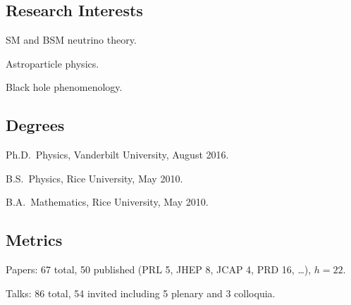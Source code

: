 \documentclass{article}
\renewenvironment{itemize}{
\begin{list}{}{
\setlength{\leftmargin}{.5em}}}{
\end{list}}
\begin{document}
\subsection*{Research Interests}
\begin{itemize}
\item SM and BSM neutrino theory.
\item Astroparticle physics.
\item Black hole phenomenology.
\end{itemize}

\subsection*{Degrees}
\begin{itemize}
\item Ph.D.~Physics, Vanderbilt University, August 2016.
\item B.S.~Physics, Rice University, May 2010.
\item B.A.~Mathematics, Rice University, May 2010.
\end{itemize}

\subsection*{Metrics}
\begin{itemize}
\item Papers: 67 total, 50 published (PRL 5, JHEP 8, JCAP 4, PRD 16, \dots), $h=22$.
\item Talks: 86 total, 54 invited including 5 plenary and 3 colloquia.
\end{itemize}
\end{document}
